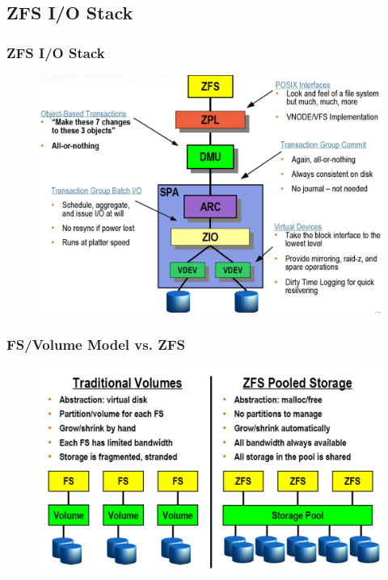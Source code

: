 \subsection{ZFS I/O Stack} %
\begin{frame}[fragile]
    \frametitle{ZFS I/O Stack}
    \begin{figure}
    \includegraphics[width=0.65\linewidth]{figs/ZFS-stack.png}
    \end{figure}  
\end{frame}
% 
% 
\begin{frame}[fragile]
    \frametitle{FS/Volume Model vs. ZFS}
    \begin{figure}
    \includegraphics[width=0.8\linewidth]{figs/ZFS-pooled-storage.png}
    \end{figure}
\end{frame}
